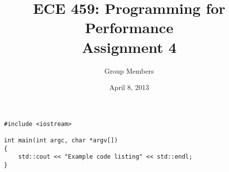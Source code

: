 \documentclass[12pt]{article}
\title{ECE 459: Programming for Performance\\Assignment 4}
\author{Group Members}
\date{April 8, 2013}
\begin{document}
\maketitle

\begin{lstlisting}
#include <iostream>

int main(int argc, char *argv[])
{
    std::cout << "Example code listing" << std::endl;
}
\end{lstlisting}
\end{document}
